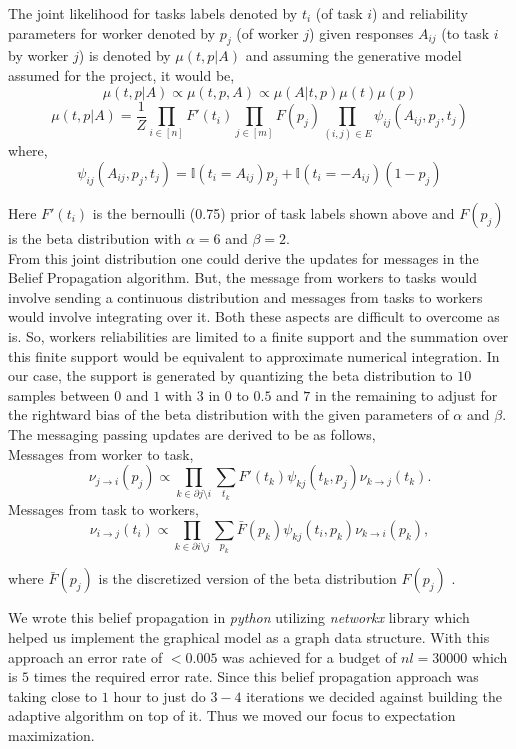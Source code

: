 \documentclass[10pt]{article}
\begin{document}
The joint likelihood for tasks labels denoted by $t_i$ (of task $i$) and reliability parameters for worker denoted by $p_j$ (of worker $j$) given responses $A_{ij}$ (to task $i$ by worker $j$) is denoted by $\mu(t,p\vert A)$ and assuming the generative model assumed for the project, it would be,
$$\mu(t,p\vert A) \propto \mu(t,p,A) \propto \mu(A\vert t,p)\mu(t)\mu(p)$$
$$\mu(t,p\vert A) = \frac{1}{Z}\prod_{i\in [n]}{F'(t_i)}\prod_{j\in [m]}{F(p_j)}\prod_{(i,j)\in E}\psi_{ij}(A_{ij},p_j,t_j)$$
where, $$\psi_{ij}(A_{ij}, p_j, t_j) = \mathbb{I}(t_i=A_{ij})p_j + \mathbb{I}(t_i=-A_{ij})(1-p_j)$$

Here $F'(t_i)$ is the bernoulli (0.75) prior of task labels shown above and $F(p_j)$ is the beta distribution with $\alpha = 6$ and $\beta = 2$.\\

From this joint distribution one could derive the updates for messages in the Belief Propagation algorithm. But, the message from workers to tasks would involve sending a continuous distribution and messages from tasks to workers would involve integrating over it. Both these aspects are difficult to overcome as is. So, workers reliabilities are limited to a finite support and the summation over this finite support would be equivalent to approximate numerical integration. In our case, the support is generated by quantizing the beta distribution to $10$ samples between $0$ and $1$ with $3$ in $0$ to $0.5$ and $7$ in the remaining to adjust for the rightward bias of the beta distribution with the given parameters of $\alpha$ and $\beta$. The messaging passing updates are derived to be as follows,\\
  	Messages from worker to task,
  	$$\nu_{j\rightarrow i}(p_j)\propto\prod_{k\in \partial j\setminus i}\sum_{t_k}F'(t_k)\psi_{kj}(t_k, p_j)\nu_{k\rightarrow j}(t_k).$$
  	Messages from task to workers,
  	$$\nu_{i\rightarrow j}(t_i)\propto\prod_{k\in \partial i\setminus j}\sum_{p_k}\bar{F}(p_k)\psi_{kj}(t_i, p_k)\nu_{k\rightarrow i}(p_k),$$
 
where $\bar{F}(p_j)$ is the discretized version of the beta distribution $F(p_j)$ .
 
 We wrote this belief propagation in \textit{python} utilizing \textit{networkx} library which helped us implement the graphical model as a graph data structure. With this approach an error rate of $<0.005$ was achieved for a budget of $nl = 30000$ which is $5$ times the required error rate. Since this belief propagation approach was taking close to $1$ hour to just do $3-4$ iterations we decided against building the adaptive algorithm on top of it. Thus we moved our focus to expectation maximization.
 
\end{document}
